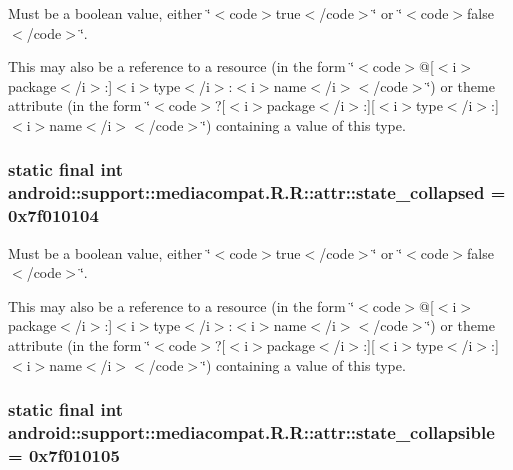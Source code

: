 Must be a boolean value, either \char`\"{}$<$code$>$true$<$/code$>$\char`\"{} or \char`\"{}$<$code$>$false$<$/code$>$\char`\"{}. 

This may also be a reference to a resource (in the form \char`\"{}$<$code$>$@\mbox{[}$<$i$>$package$<$/i$>$:\mbox{]}$<$i$>$type$<$/i$>$:$<$i$>$name$<$/i$>$$<$/code$>$\char`\"{}) or theme attribute (in the form \char`\"{}$<$code$>$?\mbox{[}$<$i$>$package$<$/i$>$:\mbox{]}\mbox{[}$<$i$>$type$<$/i$>$:\mbox{]}$<$i$>$name$<$/i$>$$<$/code$>$\char`\"{}) containing a value of this type. \hypertarget{classandroid_1_1support_1_1mediacompat_1_1_r_1_1attr_11cad78d6f80ff0482073ebd710b21c7}{
\subsubsection[{state\_\-collapsed}]{\setlength{\rightskip}{0pt plus 5cm}static final int android::support::mediacompat.R.R::attr::state\_\-collapsed = 0x7f010104}}
\label{classandroid_1_1support_1_1mediacompat_1_1_r_1_1attr_11cad78d6f80ff0482073ebd710b21c7}


Must be a boolean value, either \char`\"{}$<$code$>$true$<$/code$>$\char`\"{} or \char`\"{}$<$code$>$false$<$/code$>$\char`\"{}. 

This may also be a reference to a resource (in the form \char`\"{}$<$code$>$@\mbox{[}$<$i$>$package$<$/i$>$:\mbox{]}$<$i$>$type$<$/i$>$:$<$i$>$name$<$/i$>$$<$/code$>$\char`\"{}) or theme attribute (in the form \char`\"{}$<$code$>$?\mbox{[}$<$i$>$package$<$/i$>$:\mbox{]}\mbox{[}$<$i$>$type$<$/i$>$:\mbox{]}$<$i$>$name$<$/i$>$$<$/code$>$\char`\"{}) containing a value of this type. \hypertarget{classandroid_1_1support_1_1mediacompat_1_1_r_1_1attr_4e10cbe5c621530d2bca6ab818a22f49}{
\subsubsection[{state\_\-collapsible}]{\setlength{\rightskip}{0pt plus 5cm}static final int android::support::mediacompat.R.R::attr::state\_\-collapsible = 0x7f010105}}
\label{classandroid_1_1support_1_1mediacompat_1_1_r_1_1attr_4e10cbe5c621530d2bca6ab818a22f49}


